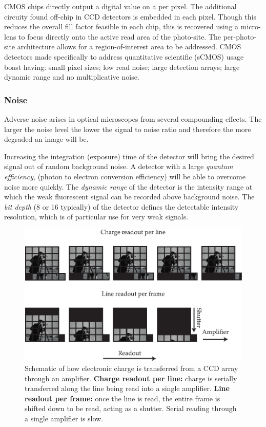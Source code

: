 CMOS chips directly output a digital value on a per pixel.
The additional circuity found off-chip in CCD detectors is embedded in each pixel.
Though this reduces the overall fill factor feasible in each chip, this is recovered using a micro-lens to focus directly onto the active read area of the photo-site.
The per-photo-site architecture allows for a region-of-interest area to be addressed.
CMOS detectors made specifically to address quantitative scientific (sCMOS) usage boast having: small pixel sizes; low read noise; large detection arrays; large dynamic range and no multiplicative noise.




\subsubsection{Noise}

Adverse noise arises in optical microscopes from several compounding effects.
The larger the noise level the lower the signal to noise ratio and therefore the more degraded an image will be.

Increasing the integration (exposure) time of the detector will bring the desired signal out of random background noise.
A detector with a large \emph{quantum efficiency}, (photon to electron conversion efficiency) will be able to overcome noise more quickly.
The \emph{dynamic range} of the detector is the intensity range at which the weak fluorescent signal can be recorded above background noise.
The \emph{bit depth} (8 or \SI{16}{\bit} typically) of the detector defines the detectable intensity resolution, which is of particular use for very weak signals.

\begin{figure}
    \centering
    \includegraphics{./sensor_chips}
    \caption{Schematic of how electronic charge is transferred from a CCD array through an amplifier.
    \textbf{Charge readout per line:} charge is serially transferred along the line being read into a single amplifier.
    \textbf{Line readout per frame:} once the line is read, the entire frame is shifted down to be read, acting as a shutter.
    Serial reading through a single amplifier is slow.}
    \label{fig:sensor_chips}
\end{figure}

